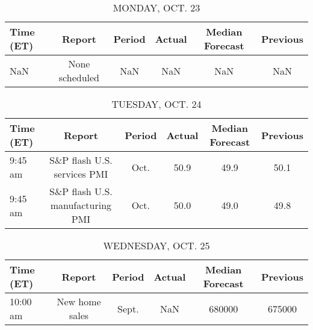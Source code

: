 \documentclass{article}%
\begin{document}
%
\normalsize%


\begin{table}[htbp]%
\caption{MONDAY, OCT. 23}%
\centering%
\begin{adjustbox}{width=1\textwidth}%
\begin{tabular}{lccccc}
\toprule
Time (ET) &         Report & Period & Actual & Median Forecast & Previous \\
\midrule
      NaN & None scheduled &    NaN &    NaN &             NaN &      NaN \\
\bottomrule
\end{tabular}
%
\end{adjustbox}%
\end{table}

%


\begin{table}[htbp]%
\caption{TUESDAY, OCT. 24}%
\centering%
\begin{adjustbox}{width=1\textwidth}%
\begin{tabular}{lccccc}
\toprule
Time (ET) &                           Report & Period & Actual & Median Forecast & Previous \\
\midrule
  9:45 am &      S\&P flash U.S. services PMI &   Oct. &   50.9 &            49.9 &     50.1 \\
  9:45 am & S\&P flash U.S. manufacturing PMI &   Oct. &   50.0 &            49.0 &     49.8 \\
\bottomrule
\end{tabular}
%
\end{adjustbox}%
\end{table}

%


\begin{table}[htbp]%
\caption{WEDNESDAY, OCT. 25}%
\centering%
\begin{adjustbox}{width=1\textwidth}%
\begin{tabular}{lccccc}
\toprule
Time (ET) &         Report & Period & Actual & Median Forecast & Previous \\
\midrule
 10:00 am & New home sales &  Sept. &    NaN &          680000 &   675000 \\
\bottomrule
\end{tabular}
%
\end{adjustbox}%
\end{table}

%
\end{document}
